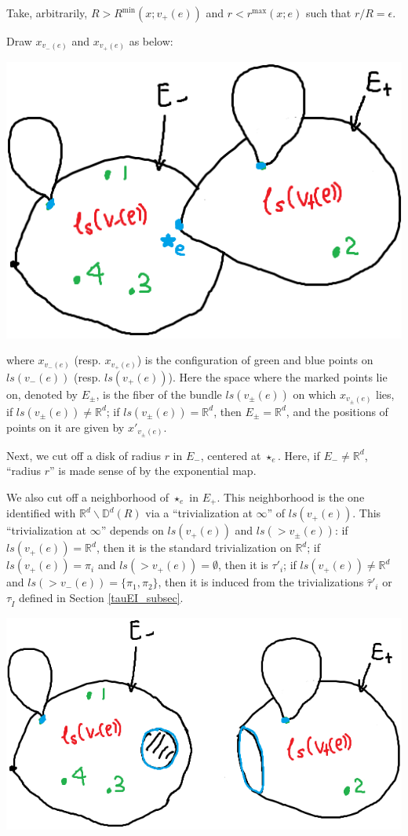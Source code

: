 \documentclass[11pt]{article}
\theoremstyle{definition}
\theoremstyle{remark}
\def\R{\mathbb{R}}
\def\D{\mathbb{D}}
\def\rI{{\mathring{I}}}
\begin{document}
Take, arbitrarily, $R>R^{\min}(x;v_+(e))$ and $r<r^{\max}(x;e)$ such that $r/R=\epsilon$. 

Draw $x_{v_-(e)}$ and $x_{v_+(e)}$ as below: 

\includegraphics[scale=0.5]{yedfn1_fig}

where $x_{v_-(e)}$ (resp. $x_{v_+(e)}$) is the configuration of green and blue points on $ls(v_-(e))$ (resp. $ls(v_+(e))$). 
Here the space where the marked points lie on, denoted by $E_\pm$, is the fiber of the bundle $ls(v_\pm(e))$ on which $x_{v_\pm(e)}$ lies, if $ls(v_\pm(e))\neq\R^d$; if $ls(v_{\pm}(e))=\R^d$, then $E_\pm=\R^d$, and the positions of points on it are given by $x'_{v_\pm(e)}$. 

Next, we cut off a disk of radius $r$ in $E_-$, centered at $\star_e$. Here, if $E_-\neq\R^d$, ``radius $r$'' is made sense of by the exponential map. 

We also cut off a neighborhood of $\star_e$ in $E_+$. This neighborhood is the one identified with $\R^d\backslash\D^d(R)$ via a ``trivialization at $\infty$'' of $ls(v_+(e))$. This ``trivialization at $\infty$'' depends on $ls(v_+(e))$ and $ls(>v_\pm(e))$: if $ls(v_+(e))=\R^d$, then it is the standard trivialization on $\R^d$; if $ls(v_+(e))=\pi_i$ and $ls(>v_+(e))=\emptyset$, then it is $\tau'_i$; if $ls(v_+(e))\neq\R^d$ and $ls(>v_-(e))=\{\pi_1,\pi_2\}$, then it is induced from the trivializations $\hat\tau'_i$ or $\tau_\rI$ defined in Section \ref{tauEI_subsec}. 

\includegraphics[scale=0.5]{yedfn2_fig}
\end{document}
